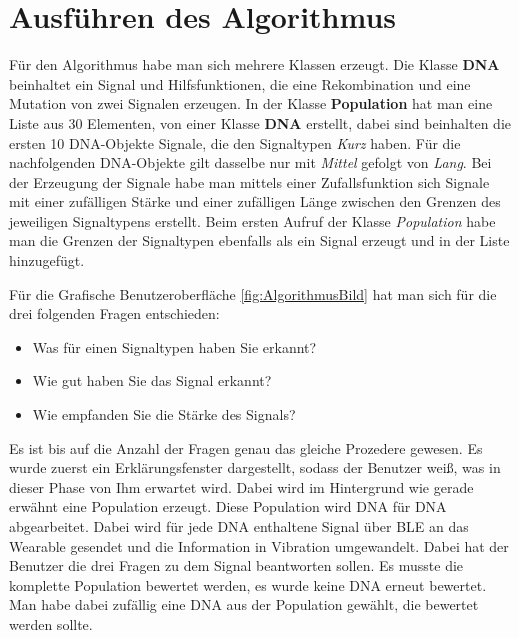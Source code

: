 \section {Ausf{\"u}hren des Algorithmus}


F{\"u}r den Algorithmus habe man sich mehrere Klassen erzeugt. 
Die Klasse \textbf{DNA} beinhaltet ein Signal und Hilfsfunktionen, die eine Rekombination und eine Mutation von zwei Signalen erzeugen.
In der Klasse \textbf{Population} hat man eine Liste aus 30 Elementen, von einer Klasse \textbf{DNA} erstellt, dabei sind beinhalten die ersten 10 DNA-Objekte Signale, die den Signaltypen \textit{Kurz} haben. F{\"u}r die nachfolgenden DNA-Objekte gilt dasselbe nur mit \textit{Mittel} gefolgt von \textit{Lang}. 
Bei der Erzeugung der Signale habe man mittels einer Zufallsfunktion sich Signale mit einer zuf{\"a}lligen St{\"a}rke und einer zuf{\"a}lligen L{\"a}nge zwischen den Grenzen des jeweiligen Signaltypens erstellt. Beim ersten Aufruf der Klasse \textit{Population} habe man die Grenzen der Signaltypen ebenfalls als ein Signal erzeugt und in der Liste hinzugef{\"u}gt.

F{\"u}r die Grafische Benutzeroberfl{\"a}che \autoref{fig:AlgorithmusBild} hat man sich f{\"u}r die drei folgenden Fragen entschieden:
\begin{itemize}
\item Was f{\"u}r einen Signaltypen haben Sie erkannt?
\item Wie gut haben Sie das Signal erkannt?
\item Wie empfanden Sie die St{\"a}rke des Signals?
\end{itemize}

Es ist bis auf die Anzahl der Fragen genau das gleiche Prozedere gewesen. Es wurde zuerst ein Erkl{\"a}rungsfenster dargestellt, sodass der Benutzer wei{\ss}, was in dieser Phase von Ihm erwartet wird. 
Dabei wird im Hintergrund wie gerade erw{\"a}hnt eine Population erzeugt. Diese Population wird DNA f{\"u}r DNA abgearbeitet. Dabei wird f{\"u}r jede DNA enthaltene Signal {\"u}ber BLE an das Wearable gesendet und die Information in Vibration umgewandelt. Dabei hat der Benutzer die drei Fragen zu dem Signal beantworten sollen. 
Es musste die komplette Population bewertet werden, es wurde keine DNA erneut bewertet. Man habe dabei zuf{\"a}llig eine DNA aus der Population gew{\"a}hlt, die bewertet werden sollte.

